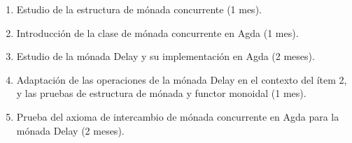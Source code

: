 \documentclass[11pt,a4paper]{article}
\begin{document}
\begin{enumerate}

\item Estudio de la estructura de mónada concurrente (1 mes).

\item Introducción de la clase de mónada concurrente en Agda (1 mes).

\item Estudio de la mónada Delay y su implementación en Agda (2 meses).

\item Adaptación de las operaciones de la mónada Delay en el contexto del ítem 2, y las pruebas de estructura de mónada y functor monoidal (1 mes).

\item Prueba del axioma de intercambio de mónada concurrente en Agda
para la mónada Delay (2 meses).

\end{enumerate}



\end{document}
